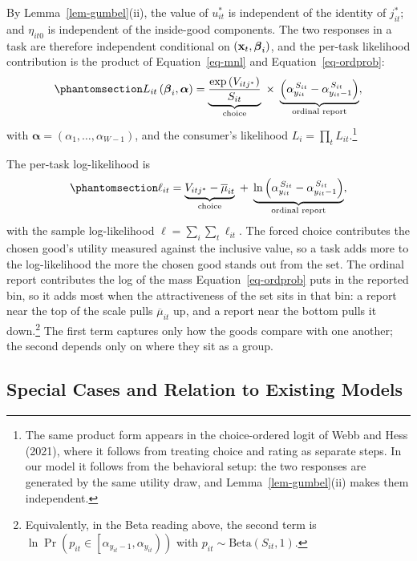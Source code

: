 \documentclass[
  letterpaper,
  DIV=11,
  numbers=noendperiod]{scrartcl}
\theoremstyle{plain}
\theoremstyle{plain}
\theoremstyle{plain}
\theoremstyle{remark}
\begin{document}
By Lemma~\ref{lem-gumbel}(ii), the value of \(u^*_{it}\) is independent
of the identity of \(j^*_{it}\); and \(\eta_{it0}\) is independent of
the inside-good components. The two responses in a task are therefore
independent conditional on \((\mathbf{x}_t, \boldsymbol{\beta}_i)\), and the per-task
likelihood contribution is the product of Equation~\ref{eq-mnl} and
Equation~\ref{eq-ordprob}:
\begin{equation}\protect\phantomsection\label{eq-joint}{
L_{it} \left( \bfbeta_i, \boldsymbol{\alpha} \right)
= \underbrace{\frac{\exp \left( V_{itj^*} \right)}{S_{it}}}_{\text{choice}}
\; \times \;
\underbrace{\left( \alpha_{y_{it}}^{\,S_{it}} - \alpha_{y_{it}-1}^{\,S_{it}} \right)}_{\text{ordinal report}},
}\end{equation} with
\(\boldsymbol{\alpha} = (\alpha_1, \ldots, \alpha_{W-1})\), and the
consumer's likelihood \(L_i = \prod_{t} L_{it}\).\footnote{The same
  product form appears in the choice-ordered logit of Webb and Hess
  (2021), where it follows from treating choice and rating as separate
  steps. In our model it follows from the behavioral setup: the two
  responses are generated by the same utility draw, and
  Lemma~\ref{lem-gumbel}(ii) makes them independent.}

The per-task log-likelihood is
\begin{equation}\protect\phantomsection\label{eq-loglik}{
\ell_{it} = \underbrace{V_{itj^*} - \overline{\mu}_{it}}_{\text{choice}}
\; + \;
\underbrace{\ln \left( \alpha_{y_{it}}^{\,S_{it}} - \alpha_{y_{it}-1}^{\,S_{it}} \right)}_{\text{ordinal report}},
}\end{equation} with the sample log-likelihood
\(\ell = \sum_i \sum_t \ell_{it}\). The forced choice contributes the
chosen good's utility measured against the inclusive value, so a task
adds more to the log-likelihood the more the chosen good stands out from
the set. The ordinal report contributes the log of the mass
Equation~\ref{eq-ordprob} puts in the reported bin, so it adds most when
the attractiveness of the set sits in that bin: a report near the top of
the scale pulls \(\overline{\mu}_{it}\) up, and a report near the bottom
pulls it down.\footnote{Equivalently, in the Beta reading above, the
  second term is
  \(\ln \Pr \left( p_{it} \in \left[ \alpha_{y_{it}-1}, \alpha_{y_{it}} \right) \right)\)
  with \(p_{it} \sim \text{Beta}\left( S_{it}, 1 \right)\).} The first
term captures only how the goods compare with one another; the second
depends only on where they sit as a group.

\subsection{Special Cases and Relation to Existing
Models}\label{sec-nesting}
\end{document}
